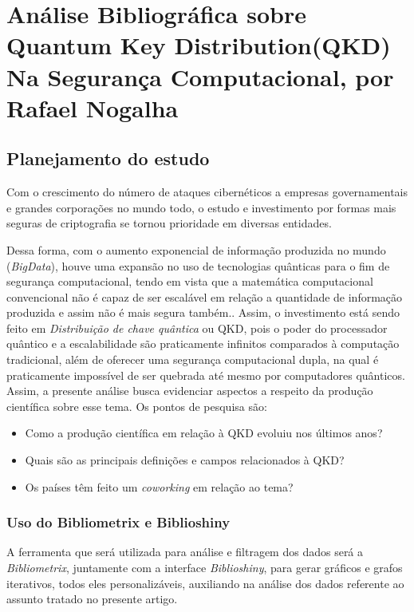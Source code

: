 \chapter{Análise Bibliográfica sobre Quantum Key Distribution(QKD) Na Segurança Computacional, por Rafael Nogalha\label{chap:bibliometria:rafaelnogalha}}

\section{Planejamento do estudo}

Com o crescimento do número de ataques cibernéticos a empresas governamentais e grandes corporações no mundo todo, o estudo e investimento por formas mais seguras de criptografia se tornou prioridade em diversas entidades. 

Dessa forma, com o aumento exponencial de informação produzida no mundo (\textit{BigData}), houve uma expansão no uso de tecnologias quânticas para o fim de segurança computacional, tendo em vista que a matemática computacional convencional não é capaz de ser escalável em relação a quantidade de informação produzida e assim não é mais segura também.. Assim, o investimento está sendo feito em \textit{Distribuição de chave quântica} ou QKD, pois o poder do processador quântico e a escalabilidade são praticamente infinitos comparados à computação tradicional, além de oferecer uma segurança computacional dupla, na qual é praticamente impossível de ser quebrada até mesmo por computadores quânticos. Assim, a presente análise busca evidenciar aspectos a respeito da produção científica sobre esse tema. Os pontos de pesquisa são:

\begin{itemize}
    \item Como a produção científica em relação à QKD evoluiu nos últimos anos?
    \item Quais são as principais definições e campos relacionados à QKD?
    \item Os países têm feito um \textit{coworking} em relação ao tema?
\end{itemize}

\subsection{Uso do Bibliometrix e Biblioshiny}

A ferramenta que será utilizada para análise e filtragem dos dados será a \textit{Bibliometrix}, juntamente com a interface \textit{Biblioshiny}, para gerar gráficos e grafos iterativos, todos eles personalizáveis, auxiliando na análise dos dados referente ao assunto tratado no presente artigo.

